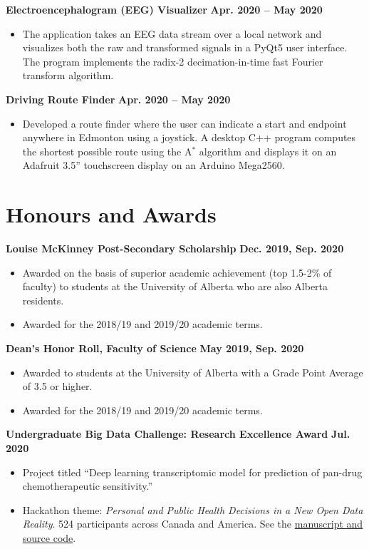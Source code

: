 \documentclass{article}
\begin{document}
\textbf{Electroencephalogram (EEG) Visualizer} \hfill \textbf{Apr. 2020 -- May 2020}
\begin{itemize}
    \item The application takes an EEG data stream over a local network and visualizes both the raw and transformed signals in a PyQt5 user interface. The program implements the radix-2 decimation-in-time fast Fourier transform algorithm.
\end{itemize}

\textbf{Driving Route Finder} \hfill \textbf{Apr. 2020 -- May 2020}
\begin{itemize}
    \item Developed a route finder where the user can indicate a start and endpoint anywhere in Edmonton using a joystick. A desktop C++ program computes the shortest possible route using the A$^*$ algorithm and displays it on an Adafruit 3.5'' touchscreen display on an Arduino Mega2560.
\end{itemize}


\section*{\textcolor{my_colour}{Honours and Awards}}
\vspace{-.25em} \hrulefill \vspace{.75em}

\textbf{Louise McKinney Post-Secondary Scholarship} \hfill \textbf{Dec. 2019, Sep. 2020}
\begin{itemize}
    \item Awarded on the basis of superior academic achievement (top 1.5-2\% of faculty) to students at the University of Alberta who are also Alberta residents.
    \item Awarded for the 2018/19 and 2019/20 academic terms.
\end{itemize}

\textbf{Dean's Honor Roll, Faculty of Science} \hfill \textbf{May 2019, Sep. 2020}
\begin{itemize}
    \item Awarded to students at the University of Alberta with a Grade Point Average of 3.5 or higher.
    \item Awarded for the 2018/19 and 2019/20 academic terms.
\end{itemize}

\textbf{Undergraduate Big Data Challenge: Research Excellence Award} \hfill \textbf{Jul. 2020}
\begin{itemize}
    \item Project titled ``Deep learning transcriptomic model for prediction of pan-drug chemotherapeutic sensitivity.''
    \item Hackathon theme: \textit{Personal and Public Health Decisions in a New Open Data Reality}. 524 participants across Canada and America. See the \href{https://github.com/tig3r66/youreka_genes}{manuscript and source code}.
\end{itemize}
\end{document}
